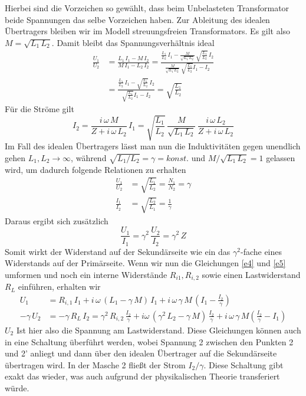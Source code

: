 \documentclass[a4paper, 12pt,]{scrartcl}
\begin{document}
Hierbei sind die Vorzeichen so gewählt, dass beim Unbelasteten Transformator beide Spannungen das selbe Vorzeichen haben. Zur Ableitung des idealen Übertragers bleiben wir im Modell streuungsfreien Transformators. Es gilt also $M=\sqrt{L_1\,L_2}$. Damit bleibt das Spannungsverhältnis ideal
\begin{align*}\frac{U_1}{U_2}&=\frac{L_1\,I_1-M\,I_2}{M\,I_1-L_2\,I_2}=\frac{\frac{L_1}{L_2}\,I_1-\frac{M}{\sqrt{L_1\,L_2}}\,\sqrt{\frac{L_1}{L_2}}\,I_2}{\frac{M}{\sqrt{L_1\,L_2}}\,\sqrt{\frac{L_1}{L_2}}I_1-I_2}\\
&=\frac{\frac{L_1}{L_2}\,I_1-\sqrt{\frac{L_1}{L_2}}\,I_2}{\sqrt{\frac{L_1}{L_2}}I_1-I_2}=\sqrt{\frac{L_1}{L_2}}\end{align*}
Für die Ströme gilt
$$I_2=\frac{i\,\omega\,M}{Z+i\,\omega\,L_2}\,I_1=\sqrt{\frac{L_1}{L_2}}\,\frac{M}{\sqrt{L_1\,L_2}}\,\frac{i\,\omega\,L_2}{Z+i\,\omega\,L_2}$$
Im Fall des idealen Übertragers lässt man nun die Induktivitäten gegen unendlich gehen $L_1,L_2\rightarrow\infty$, während $\sqrt{L_1/L_2}=\gamma=konst.$ und $M/\sqrt{L_1\,L_2}=1$ gelassen wird, um dadurch folgende Relationen zu erhalten
\begin{align}\label{e6}\frac{U_1}{U_2}&=\sqrt{\frac{L_1}{L_2}}=\frac{N_1}{N_2}=\gamma\\
\frac{I_1}{I_2}&=\sqrt{\frac{L_2}{L_1}}=\frac{1}{\gamma}\label{e7}\end{align}
Daraus ergibt sich zusätzlich
\begin{equation}\frac{U_1}{I_1}=\gamma^2\,\frac{U_2}{I_2}=\gamma^2\,Z\label{e8}\end{equation}
Somit wirkt der Widerstand auf der Sekundärseite wie ein das $\gamma^2$-fache eines Widerstands auf der Primärseite. Wenn wir nun die Gleichungen \cref{e4} und \cref{e5} umformen und noch ein interne Widerstände $R_{i1},R_{i,2}$ sowie einen Lastwiderstand $R_L$ einführen, erhalten wir
\begin{align}\label{e9}U_1&=R_{i,1}\,I_1+i\,\omega\,\left(L_1-\gamma\,M\right)\,I_1+i\,\omega\,\gamma\,M\,\left(I_1-\frac{I_2}{\gamma}\right)\\
-\gamma\,U_2&=-\gamma\,R_L\,I_2=\gamma^2\,R_{i,2}\,\frac{I_2}{\gamma}+i\omega\,\left(\gamma^2\,L_2-\gamma\,M\right)\,\frac{I_2}{\gamma}+i\,\omega\,\gamma\,M\left(\frac{I_2}{\gamma}-I_1\right)\label{e10}\end{align}
$U_2$ Ist hier also die Spannung am Lastwiderstand. Diese Gleichungen können auch in eine Schaltung überführt werden, wobei Spannung 2 zwischen den Punkten 2 und 2' anliegt und dann über den idealen Übertrager auf die Sekundärseite übertragen wird. In der Masche 2 fließt der Strom $I_2/\gamma$. Diese Schaltung gibt exakt das wieder, was auch aufgrund der physikalischen Theorie transferiert würde.
\end{document}
